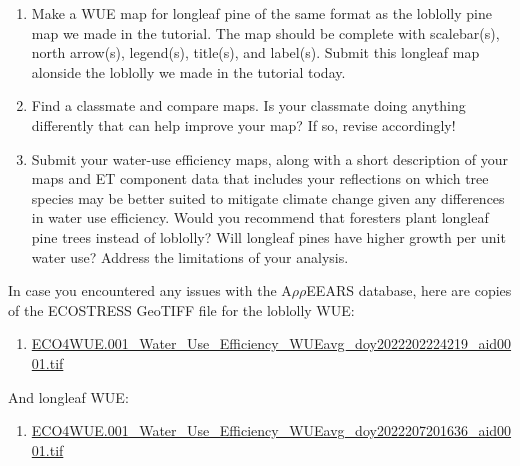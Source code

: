 \documentclass[oneside,a4paper,11pt,explicit]{book}
\begin{document}
\begin{tcolorbox}[colback=yellow!5!white,colframe=MACred,title= \vspace{.2em} \Large Make a Map Assignments]
	\large
	\begin{enumerate}
		\item Make a WUE map for longleaf pine of the same format as the loblolly pine map we made in the tutorial. The map should be complete with scalebar(s), north arrow(s), legend(s), title(s), and label(s). Submit this longleaf map alonside the loblolly we made in the tutorial today.
        \item Find a classmate and compare maps. Is your classmate doing anything differently that can help improve your map? If so, revise accordingly! 
        \item Submit your water-use efficiency maps, along with a short description of your maps and ET component data that includes your reflections on which tree species may be better suited to mitigate climate change given any differences in water use efficiency. Would you recommend that foresters plant longleaf pine trees instead of loblolly? Will longleaf pines have higher growth per unit water use? Address the limitations of your analysis.
	\end{enumerate}
\end{tcolorbox}

\begin{tcolorbox}[colback=yellow!5!white,title=\textbf{Datafiles}]
	\large
	In case you encountered any issues with the A$\rho\rho$EEARS database, here are copies of the ECOSTRESS GeoTIFF file for the loblolly WUE:
	\begin{enumerate}
		\item \href{https://jeremydforsythe.github.io/icecream-tutorials/Tutorial10_Evapotranspiration2/ECO4WUE.001_Water_Use_Efficiency_WUEavg_doy2022202224219_aid0001.tif}{\small ECO4WUE.001\_Water\_Use\_Efficiency\_WUEavg\_doy2022202224219\_aid0001.tif}
	\end{enumerate}
	And longleaf WUE:
	\begin{enumerate}
		\item \href{https://jeremydforsythe.github.io/icecream-tutorials/Tutorial10_Evapotranspiration2/ECO4WUE.001_Water_Use_Efficiency_WUEavg_doy2022207201636_aid0001.tif}{\small ECO4WUE.001\_Water\_Use\_Efficiency\_WUEavg\_doy2022207201636\_aid0001.tif}
	\end{enumerate}
\end{tcolorbox}
\end{document}
